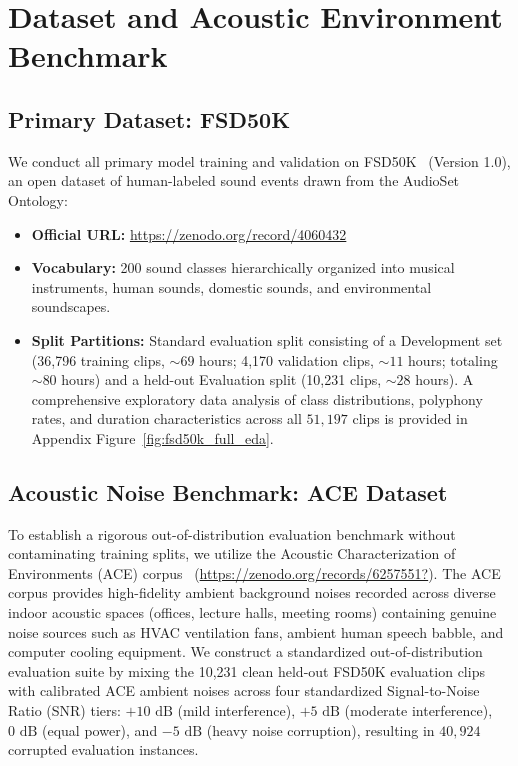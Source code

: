 \documentclass[11pt,a4paper]{article}
\begin{document}
\section{Dataset and Acoustic Environment Benchmark}

\subsection{Primary Dataset: FSD50K}
We conduct all primary model training and validation on FSD50K~\cite{fonseca2021fsd50k} (Version 1.0), an open dataset of human-labeled sound events drawn from the AudioSet Ontology:
\begin{itemize}
    \item \textbf{Official URL:} \url{https://zenodo.org/record/4060432}
    \item \textbf{Vocabulary:} 200 sound classes hierarchically organized into musical instruments, human sounds, domestic sounds, and environmental soundscapes.
    \item \textbf{Split Partitions:} Standard evaluation split consisting of a Development set (36,796 training clips, $\sim 69$ hours; 4,170 validation clips, $\sim 11$ hours; totaling $\sim 80$ hours) and a held-out Evaluation split (10,231 clips, $\sim 28$ hours). A comprehensive exploratory data analysis of class distributions, polyphony rates, and duration characteristics across all $51,197$ clips is provided in Appendix Figure~\ref{fig:fsd50k_full_eda}.
\end{itemize}

\subsection{Acoustic Noise Benchmark: ACE Dataset}
To establish a rigorous out-of-distribution evaluation benchmark without contaminating training splits, we utilize the Acoustic Characterization of Environments (ACE) corpus~\cite{eaton2016ace} (\url{https://zenodo.org/records/6257551?}). The ACE corpus provides high-fidelity ambient background noises recorded across diverse indoor acoustic spaces (offices, lecture halls, meeting rooms) containing genuine noise sources such as HVAC ventilation fans, ambient human speech babble, and computer cooling equipment. We construct a standardized out-of-distribution evaluation suite by mixing the 10,231 clean held-out FSD50K evaluation clips with calibrated ACE ambient noises across four standardized Signal-to-Noise Ratio (SNR) tiers: $+10\text{ dB}$ (mild interference), $+5\text{ dB}$ (moderate interference), $0\text{ dB}$ (equal power), and $-5\text{ dB}$ (heavy noise corruption), resulting in $40,924$ corrupted evaluation instances.
\end{document}
